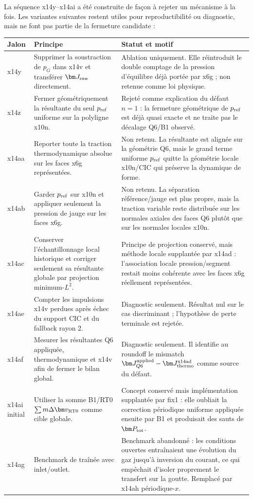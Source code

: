 \documentclass[11pt,a4paper]{article}
\begin{document}
La séquence x14y--x14ai a été construite de façon à rejeter un mécanisme à la fois. Les variantes suivantes restent utiles pour reproductibilité ou diagnostic, mais ne font pas partie de la fermeture candidate :
\begin{center}
\small
\begin{tabular}{p{}p{}p{}}
\toprule
Jalon & Principe & Statut et motif\\
\midrule
x14y & Supprimer la soustraction de $p_G$ dans x14v et transférer $\bm J_{\rm raw}$ directement. & Ablation uniquement. Elle réintroduit le double comptage de la pression d'équilibre déjà portée par x6g ; non retenue comme loi physique.\\
x14z & Fermer géométriquement la résultante du seul $p_{\rm ref}$ uniforme sur la polyligne x10n. & Rejeté comme explication du défaut $n=1$ : la fermeture géométrique de $p_{\rm ref}$ est déjà quasi exacte et ne traite pas le décalage Q6/B1 observé.\\
x14aa & Reporter toute la traction thermodynamique absolue sur les faces x6g représentées. & Non retenu. La résultante est alignée sur la géométrie Q6, mais le grand terme uniforme $p_{\rm ref}$ quitte la géométrie locale x10n/CIC qui préserve la dynamique de forme.\\
x14ab & Garder $p_{\rm ref}$ sur x10n et appliquer seulement la pression de jauge sur les faces x6g. & Non retenu. La séparation référence/jauge est plus propre, mais la traction variable reste distribuée sur les normales axiales des faces Q6 plutôt que sur les normales locales x10n.\\
x14ac & Conserver l'échantillonnage local historique et corriger seulement sa résultante globale par projection minimum-$L^2$. & Principe de projection conservé, mais méthode locale supplantée par x14ad : l'association locale pression/segment restait moins cohérente avec les faces x6g réellement représentées.\\
x14ae & Compter les impulsions x14v perdues après échec du support CIC et du fallback rayon 2. & Diagnostic seulement. Résultat nul sur le cas discriminant ; l'hypothèse de perte terminale est rejetée.\\
x14af & Mesurer les résultantes Q6 appliquée, thermodynamique et x14v afin de fermer le bilan global. & Diagnostic seulement. Il identifie au roundoff le mismatch $\bm J_{Q6}^{\rm applied}-\bm J_{\rm thermo}^{\rm x14ad}$ comme source du défaut.\\
x14ai initial & Utiliser la somme B1/RT0 $\sum m\Delta\bm v_{\rm RT0}$ comme cible globale. & Concept conservé mais implémentation supplantée par fix1 : elle oubliait la correction périodique uniforme appliquée ensuite par B1 et produisait des sauts de $\bm P_{\rm tot}$.\\
x14ag & Benchmark de traînée avec inlet/outlet. & Benchmark abandonné : les conditions ouvertes entraînaient une évolution du gaz jusqu'à inversion du courant, ce qui empêchait d'isoler proprement le transfert sur la goutte. Remplacé par x14ah périodique-$x$.\\
\bottomrule
\end{tabular}
\end{center}
\end{document}
